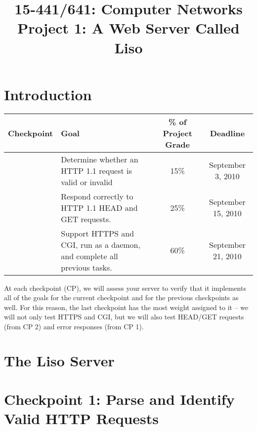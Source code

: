 \documentclass{article}
\begin{document}
\title{	15-441/641: Computer Networks\\
Project 1: A Web Server Called Liso\\
}
\date{}

\maketitle

\section{Introduction}


\begin{center}
\vspace{10pt}
\begin{tabular}{cp{2.25in}cc}
  {\bf Checkpoint}&{\bf Goal}&{\bf \% of Project Grade}&{\bf Deadline}\\

  \hline
  
  \addlinespace[5pt]
  1&Determine whether an HTTP 1.1 request is valid or invalid&15\%&September 3, 2010\\
  
  \addlinespace[5pt]
  2&Respond correctly to HTTP 1.1 HEAD and GET requests.&25\%&September 15, 2010\\
  
  \addlinespace[5pt]
  3&Support HTTPS and CGI, run as a daemon, and complete all previous tasks.&60\%&September 21, 2010\\
\end{tabular}
\end{center}

\noindent At each checkpoint (CP), we will assess your server to verify that it implements all of the goals for the current checkpoint and for the previous checkpoints as well. 
  For this reason, the last checkpoint has the most weight assigned to it -- we will not only test HTTPS and CGI, but we will also test HEAD/GET requests (from CP 2) and error responses (from CP 1).

\newpage
\section{The Liso Server}


\newpage
\section{Checkpoint 1: Parse and Identify Valid HTTP Requests}

\end{document}
